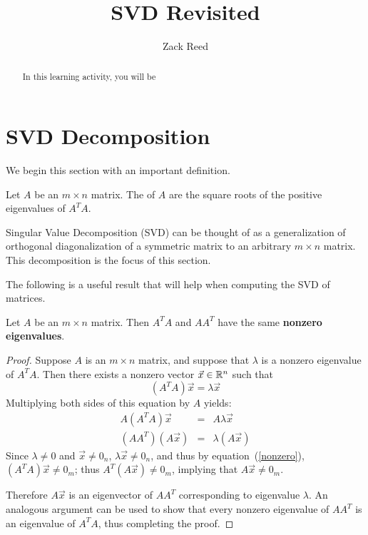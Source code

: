 \documentclass{ximera}
\author{Zack Reed}
\title{SVD Revisited}
\begin{document}
\begin{abstract}

    In this learning activity, you will be 
\end{abstract}
\maketitle

\section*{SVD Decomposition}
We begin this section with an important definition.
 
\begin{definition}\label{singularvalues}
Let $A$ be an $m\times n$ matrix. The  of $A$ are the square roots of the positive
eigenvalues of $A^TA.$
\end{definition}
 
Singular Value Decomposition (SVD) can be thought of as
a generalization of orthogonal diagonalization of a symmetric matrix
to an arbitrary $m\times n$ matrix. This decomposition is the focus of this section.
 
The following is a useful result that will help when computing the SVD of matrices.
 
\begin{lemma}\label{lem:samenonzeroeigenvalues}
Let $A$ be an $m \times n$ matrix. Then $A^TA$ and $AA^T$ have the same \textbf{nonzero eigenvalues}.
\end{lemma}
 
\begin{proof}
Suppose $A$ is an $m\times n$ matrix, and suppose that  $\lambda$ is a nonzero eigenvalue of $A^TA$.
Then there exists a nonzero vector $\vec{x} \in \mathbb{R}^n$ such that
\begin{equation}\label{nonzero}
(A^TA)\vec{x}=\lambda \vec{x}
\end{equation}
Multiplying both sides of this equation by $A$ yields:
\begin{eqnarray*}
A(A^TA)\vec{x} & = & A\lambda \vec{x}\\
(AA^T)(A\vec{x}) & = & \lambda (A\vec{x})
\end{eqnarray*}
Since $\lambda\neq 0$ and $\vec{x}\neq 0_n$, $\lambda \vec{x}\neq 0_n$,
and thus by equation~(\ref{nonzero}),
$(A^TA)\vec{x}\neq 0_m$; thus $A^T(A\vec{x})\neq 0_m$,
implying that $A\vec{x}\neq 0_m$.
 
Therefore $A\vec{x}$ is an eigenvector of $AA^T$ corresponding to eigenvalue
$\lambda$.  An analogous argument can be used to show that every
nonzero eigenvalue of $AA^T$ is an eigenvalue of $A^TA$, thus
completing the proof.
\end{proof}
 
\end{document}
